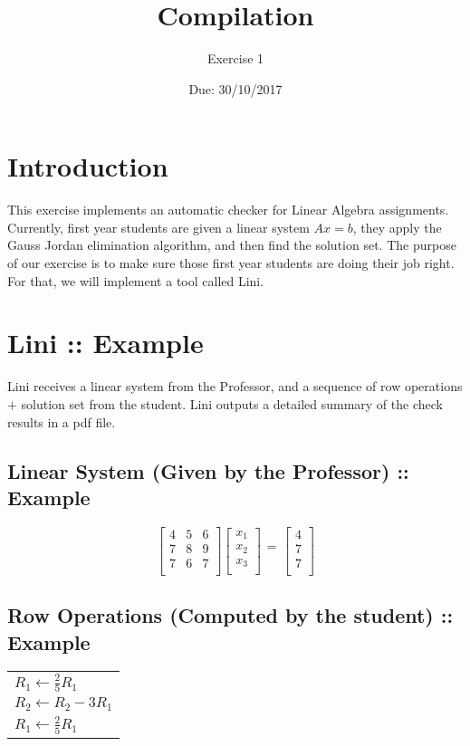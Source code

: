 \documentclass{article}
\begin{document}
\title{Compilation}
\author{Exercise 1}
\date{Due: 30/10/2017}
\maketitle

\section{Introduction}
This exercise implements an automatic checker for Linear Algebra assignments.
Currently, first year students are given a linear system $Ax=b$,
they apply the Gauss Jordan elimination algorithm, and then find the solution set.
The purpose of our exercise is to make sure those first year students
are doing their job right. For that, we will implement a tool called Lini.

\section{Lini :: Example}
Lini receives a linear system from the Professor,
and a sequence of row operations $+$ solution set from the student.
Lini outputs a detailed summary of the check results in a pdf file.

\subsection*{Linear System (Given by the Professor) :: Example}
\[
\left[
\begin{array}{ccc}
4	&	5	&	6\\
7	&	8	&	9\\
7	&	6	&	7\\
\end{array}
\right]
\left[
\begin{array}{c}
x_{1}\\
x_{2}\\
x_{3}\\
\end{array}
\right]
\begin{array}{c}
 \\
=\\
 \\
\end{array}
\left[
\begin{array}{c}
4\\
7\\
7\\
\end{array}
\right]
\]
\subsection*{Row Operations (Computed by the student) :: Example}
\begin{table}[h]
\centering
\begin{tabular}{ l }
  $R_{1} \leftarrow \frac{2}{5}R_{1}$ \\
  $R_{2} \leftarrow R_{2} - 3R_{1}$ \\
  $R_{1} \leftarrow \frac{2}{5}R_{1}$
\end{tabular}
\end{table}
\end{document}
